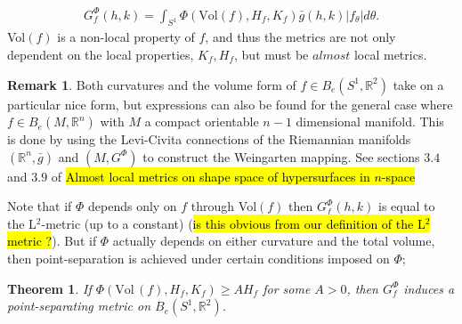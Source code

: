 \documentclass[a4,danish]{article}
\theoremstyle{break}
\newtheorem{theorem}[subsection]{Theorem}
\theoremstyle{definition}
\theoremstyle{Break}
\newtheorem{remark}[subsection]{Remark}
\newcommand{\R}{\mathbb{R}}
\begin{document}
\begin{align*}
G_f^\Phi (h,k) = \int_{S^1} \Phi(\text{Vol}(f), H_f, K_f) \bar{g}(h,k) \left| f_\theta \right| d \theta.
\end{align*}
Vol$(f)$ is a non-local property of $f$, and thus the metrics are not only dependent on the local properties, $K_f, H_f$, but must be $\textit{almost}$ local metrics. \\[0.2 cm]

\begin{remark}
Both curvatures and the volume form of $f \in B_e(S^1,\R^2)$ take on a particular nice form, but expressions can also be found for the general case where $f \in  B_e(M, \R^n)$ with $M$ a compact orientable $n-1$ dimensional manifold. This is done by using the Levi-Civita connections of the Riemannian manifolds $(\R^n,\bar{g})$ and $(M,G^\Phi)$ to construct the Weingarten mapping. See sections $3.4$ and $3.9$ of \hl{Almost local metrics on shape space of hypersurfaces in $n$-space}   
\end{remark}

Note that if $\Phi$ depends only on $f$ through Vol$(f)$ then $G_f^\Phi (h,k)$ is equal to the L$^2$-metric (up to a constant) (\hl{is this obvious from our definition of the L$^2$ metric ?}). But if $\Phi$ actually depends on either curvature and the total volume, then point-separation is achieved under certain conditions imposed on $\Phi$;

\begin{theorem}\label{point_sep}
If $\Phi(\text{Vol} \, (f), H_f, K_f) \geq A H_f$ for some $A > 0$, then $G_f^\Phi$ induces a point-separating metric on $B_e(S^1, \R^2)$.
\end{theorem}
\end{document}
